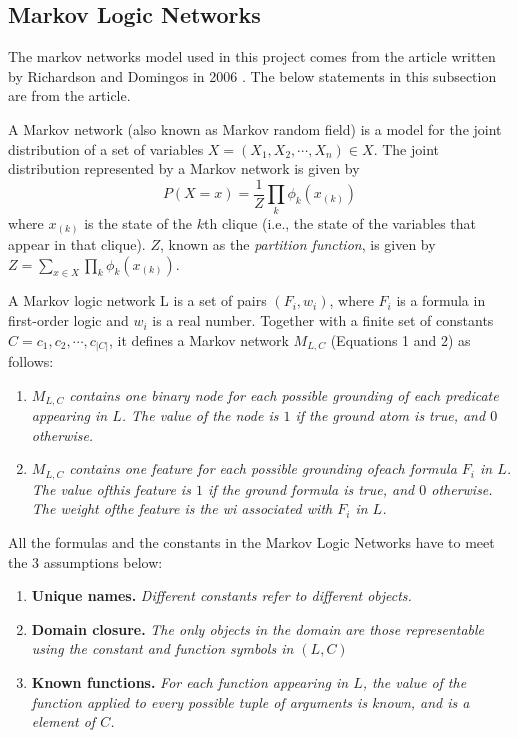 \documentclass[
12pt, %
a4paper, %
oneside, %
headinclude,footinclude, %
BCOR5mm, %
]{scrartcl}
\begin{document}
\subsection{Markov Logic Networks}
The markov networks model used in this project comes from the article written by Richardson and Domingos in 2006 \cite{richardson2006markov}. The below statements in this subsection are from the article.

A Markov network (also known as Markov random field) is a model for the joint distribution of a set of variables $X = (X_1,X_2,\cdots,X_n) \in X$. The joint distribution represented by a Markov network is given by
\begin{equation}
    P(X=x)=\frac{1}{Z}\prod_k\phi_k(x_{(k)})
\end{equation}
where $x_{(k)}$ is the state of the $k$th clique (i.e., the state of the variables that appear in that clique). $Z$, known as the \textit{partition function}, is given by $Z=\sum_{x\in X}\prod_k\phi_k(x_{(k)})$.
\begin{definition}
    A Markov logic network L is a set of pairs $(F_i, w_i)$, where $F_i$ is a formula in first-order logic and $w_i$ is a real number. Together with a finite set of constants $C = {c_1,c_2,\cdots,c_{|C|}}$, it defines a Markov network $M_{L,C}$ (Equations 1 and 2) as follows:
\end{definition}

\begin{enumerate}[noitemsep]
    \item \textit{$M_{L,C}$ contains one binary node for each possible grounding of each predicate appearing in $L$. The value of the node is $1$ if the ground atom is true, and $0$ otherwise.}
    \item \textit{$M_{L,C}$ contains one feature for each possible grounding ofeach formula $F_i$ in $L$. The value ofthis feature is $1$ if the ground formula is true, and $0$ otherwise. The weight ofthe feature is the wi associated with $F_i$ in $L$.}
\end{enumerate}

All the formulas and the constants in the Markov Logic Networks have to meet the $3$ assumptions below:

\begin{enumerate}[noitemsep]
    \item \textbf{Unique names.} \textit{Different constants refer to different objects.}
    \item \textbf{Domain closure.} \textit{The only objects in the domain are those representable using the constant and function symbols in $(L,C)$}
    \item \textbf{Known functions.} \textit{For each function appearing in $L$, the value of the function applied to every possible tuple of arguments is known, and is a element of $C$.}
\end{enumerate}
\end{document}
